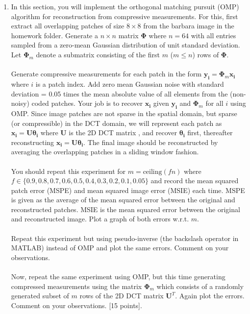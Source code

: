 \documentclass[11pt]{article}
\begin{document}
\begin{enumerate}
\item In this section, you will implement the orthogonal matching pursuit (OMP) algorithm for reconstruction from compressive measurements. For this, first extract all overlapping patches of size $8 \times 8$ from the barbara image in the homework folder. Generate a $n \times n$ matrix $\mathbf{\Phi}$ where $n = 64$ with all entries sampled from a zero-mean Gaussian distribution of unit standard deviation. Let $\mathbf{\Phi}_m$ denote a submatrix consisting of the first $m$ ($m \leq n$) rows of $\mathbf{\Phi}$. 
\\
\\
Generate compressive measurements for each patch in the form $\mathbf{y_i} = \mathbf{\Phi}_m \mathbf{x_i}$ where $i$ is a patch index. Add zero mean Gaussian noise with standard deviation = 0.05 times the mean absolute value of all elements from the (non-noisy) coded patches. Your job is to recover $\mathbf{x_i}$ given $\mathbf{y_i}$ and $\mathbf{\Phi}_m$ for all $i$ using OMP. Since image patches are not sparse in the spatial domain, but sparse (or compressible) in the DCT domain, we will represent each patch as $\mathbf{x_i} = \mathbf{U \theta_i}$ where $\mathbf{U}$ is the 2D DCT matrix , and recover $\mathbf{\theta_i}$ first, thereafter reconstructing $\mathbf{x_i} = \mathbf{U} \mathbf{\theta_i}$. The final image should be reconstructed by averaging the overlapping patches in a sliding window fashion. 
\\
\\
You should repeat this experiment for $m = \textrm{ceiling}(fn)$ where $f \in \{0.9,0.8,0.7,0.6,0.5,0.4,0.3,0.2,0.1,0.05\}$ and record the mean squared patch error (MSPE) and mean squared image error (MSIE) each time. MSPE is given as the average of the mean squared error between the original and reconstructed patches. MSIE is the mean squared error between the original and reconstructed image. Plot a graph of both errors w.r.t. $m$. 
\\
\\
Repeat this experiment but using pseudo-inverse (the backslash operator in MATLAB) instead of OMP and plot the same errors. Comment on your observations.
\\
\\
Now, repeat the same experiment using OMP, but this time generating compressed measurements using the matrix $\mathbf{\Phi}_m$ which consists of a randomly generated subset of $m$ rows of the 2D DCT matrix $\mathbf{U}^T$. Again plot the errors. Comment on your observations. \textsf{[15 points]}.

\end{enumerate}
\end{document}
